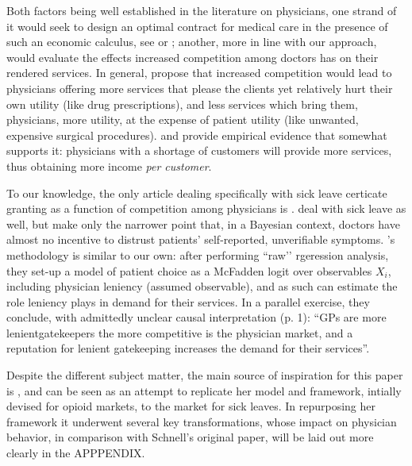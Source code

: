 \documentclass{article}
\begin{document}
Both factors being well established in the literature on physicians, one strand of it would seek to design an optimal contract for medical care in the presence of such an economic calculus, see \cite{chone-ma} or \cite{optimal-altruism}; another, more in line with our approach, would evaluate the effects increased competition among doctors has on their rendered services. In general, \cite{currie2023effects} propose that increased competition would lead to physicians offering more services that please the clients yet relatively hurt their own utility (like drug prescriptions), and less services which bring them, physicians, more utility, at the expense of patient utility (like unwanted, expensive surgical procedures). \cite{iversen-luras} and \cite{iversen2004} provide empirical evidence that somewhat supports it: physicians with a shortage of customers will provide more services, thus obtaining more income \textit{per customer}.

To our knowledge, the only article dealing specifically with sick leave certicate granting as a function of competition among physicians is \cite{markussen-roed}. \cite{cln} deal with sick leave as well, but make only the narrower point that, in a Bayesian context, doctors have almost no incentive to distrust patients’ self-reported, unverifiable symptoms. \citeauthor{markussen-roed}’s methodology is similar to our own: after performing ``raw'’ rgeression analysis, they set-up a model of patient choice as a McFadden logit over observables $X_i$, including physician leniency (assumed observable), and as such can estimate the role leniency plays in demand for their services. In a parallel exercise, they conclude, with admittedly unclear causal interpretation (p. 1): ``GPs are more lenientgatekeepers the more competitive is the physician market, and a reputation for lenient gatekeeping increases the demand for their services''.

Despite the different subject matter, the main source of inspiration for this paper is \cite{schnell2017physician}, and can be seen as an attempt to replicate her model and framework, intially devised for opioid markets, to the market for sick leaves. In repurposing her framework it underwent several key transformations, whose impact on physician behavior, in comparison with Schnell’s original paper, will be laid out more clearly in the APPPENDIX.




\newpage
	 

\end{document}
